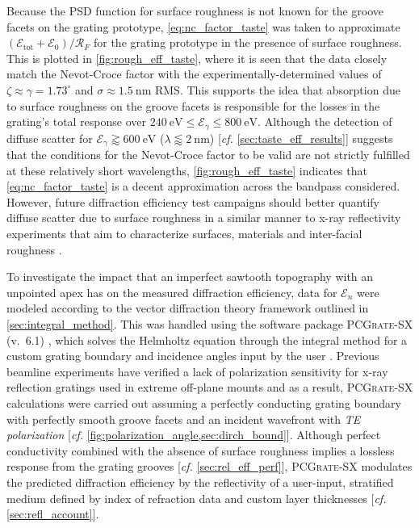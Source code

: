 Because the PSD function for surface roughness is not known for the groove facets on the grating prototype, \cref{eq:nc_factor_taste} was taken to approximate $\left( \mathscr{E}_{\text{tot}} + \mathscr{E}_0 \right) / \mathcal{R}_{F}$ for the grating prototype in the presence of surface roughness. 
This is plotted in \cref{fig:rough_eff_taste}, where it is seen that the data closely match the Nevot-Croce factor with the experimentally-determined values of $\zeta \approx \gamma = 1.73^{\circ}$ and $\sigma \approx \SI{1.5}{\nm}$ RMS. 
This supports the idea that absorption due to surface roughness on the groove facets is responsible for the losses in the grating's total response over $\SI{240}{\electronvolt} \leq \mathcal{E}_{\gamma} \leq \SI{800}{\electronvolt}$.  %
Although the detection of diffuse scatter for $\mathcal{E}_{\gamma} \gtrapprox \SI{600}{\electronvolt}$ ($\lambda \lessapprox \SI{2}{\nm}$) [\emph{cf.\@} \cref{sec:taste_eff_results}] suggests that the conditions for the Nevot-Croce factor to be valid are not strictly fulfilled at these relatively short wavelengths, \cref{fig:rough_eff_taste} indicates that \cref{eq:nc_factor_taste} is a decent approximation across the bandpass considered.
However, future diffraction efficiency test campaigns should better quantify diffuse scatter due to surface roughness in a similar manner to x-ray reflectivity experiments that aim to characterize surfaces, materials and inter-facial roughness \cite{Gay1999,Baumbach1999}. 

To investigate the impact that an imperfect sawtooth topography with an unpointed apex has on the measured diffraction efficiency, data for $\mathscr{E}_n$ were modeled according to the vector diffraction theory framework outlined in \cref{sec:integral_method}. 
This was handled using the software package \textsc{PCGrate-SX} (v.\ 6.1) \cite{PCGrate_web}, which solves the Helmholtz equation through the integral method for a custom grating boundary and incidence angles input by the user \cite[\emph{cf.\@} \cref{sec:grat_bound_consider}]{Goray10}. 
Previous beamline experiments have verified a lack of polarization sensitivity for x-ray reflection gratings used in extreme off-plane mounts \cite{Marlowe16} and as a result, \textsc{PCGrate-SX} calculations were carried out assuming a perfectly conducting grating boundary with perfectly smooth groove facets and an incident wavefront with \emph{TE polarization} [\emph{cf.\@} \cref{fig:polarization_angle,sec:dirch_bound}].  
Although perfect conductivity combined with the absence of surface roughness implies a lossless response from the grating grooves [\emph{cf.\@} \cref{sec:rel_eff_perf}], \textsc{PCGrate-SX} modulates the predicted diffraction efficiency by the reflectivity of a user-input, stratified medium defined by index of refraction data and custom layer thicknesses [\emph{cf.\@} \cref{sec:refl_account}]. 

